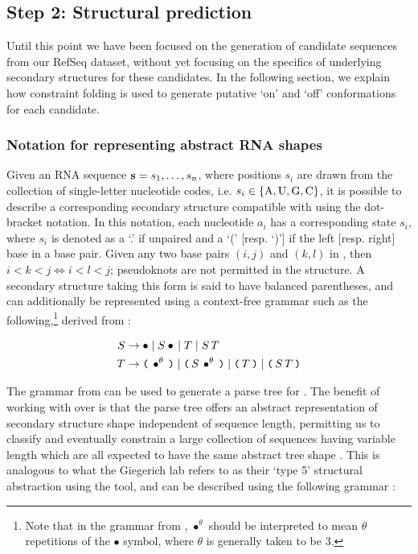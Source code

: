 \subsection{Step 2: Structural prediction}
\label{subsec:rfinder:strpred}

Until this point we have been focused on the generation of candidate sequences
from our RefSeq dataset, without yet focusing on the specifics of underlying
secondary structures for these candidates. In the following section, we explain
how constraint folding is used to generate putative `on' and `off' conformations
for each candidate.

\subsubsection{Notation for representing abstract RNA shapes}
\label{subsubsec:rfinder:shapes}

Given an RNA sequence ${\bf s} = s_1,\dots,s_n$, where positions $s_i$ are drawn from the
collection of single-letter nucleotide codes, i.e.
$s_i \in \{\text{A,\,U,\,G,\,C}\}$, it is possible to describe a corresponding
secondary structure \strS compatible with \seq using the dot-bracket notation.
In this notation, each nucleotide $a_i$ has a corresponding state $s_i$, where
$s_i$ is denoted as a `.' if unpaired and a `(' [resp. `)'] if the left [resp.
right] base in a base pair. Given any two base pairs $(i,j)$ and $(k,l)$ in \strS,
then $i < k < j \iff i < l < j$; pseudoknots are not permitted in the structure. A
secondary structure taking this form is said to have balanced parentheses, and can
additionally be represented using a context-free grammar such as the
following,\footnote{Note that in the grammar from ,
$\bullet^{\theta}$ should be interpreted to mean $\theta$ repetitions
of the $\bullet$ symbol, where $\theta$ is generally taken to be 3.}
derived from \citep{fusy:2012ka}:

\begin{align}
\label{eq:rfinder:strCfg}
\begin{split}
S &\rightarrow \bullet \;|\; S \bullet \,|\; T \;|\; S\,T \\
T &\rightarrow \bpL \bullet^{\theta} \bpR \;|\;
\bpL S\,\bullet^{\theta} \bpR \;|\; \bpL T \bpR \;|\; \bpL S\,T \bpR \\
\end{split}
\end{align}

The grammar from  can be used to generate a parse tree
\tree for \strS. The benefit of working with \tree over \strS is that the parse
tree offers an abstract representation of secondary structure shape independent of
sequence length, permitting us to classify and eventually constrain a large
collection of sequences having variable length which are all expected to have the
same abstract tree shape \citep{voss:2006iq}. This is analogous to what
the Giegerich lab refers to as
their `type 5' structural abstraction using the \rshapes tool, and can be
described using the following grammar \citep{Lorenz:2008gz}:

